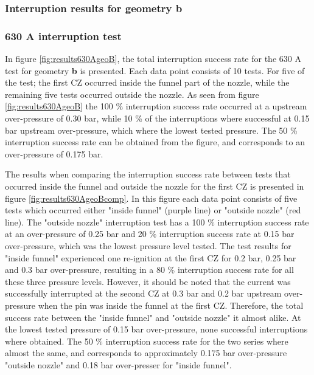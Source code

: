\documentclass[10pt,b5paper,twoside]{article}
\begin{document}
\subsubsection{Interruption results for geometry \textbf{b}} \label{sec:intTestGeoB}

\subsubsection*{630 A interruption test}

In figure \ref{fig:results630AgeoB}, the total interruption success rate for the 630 A test for geometry \textbf{b} is presented. Each data point consists of 10 tests. For five of the test; the first CZ occurred inside the funnel part of the nozzle, while the remaining five tests occurred outside the nozzle. As seen from figure \ref{fig:results630AgeoB} the 100 \% interruption success rate occurred at a upstream over-pressure of 0.30 bar, while 10 \% of the interruptions where successful at 0.15 bar upstream over-pressure, which where the lowest tested pressure. The 50 \% interruption success rate can be obtained from the figure, and corresponds to an over-pressure of 0.175 bar.

The results when comparing the interruption success rate between tests that occurred inside the funnel and outside the nozzle for the first CZ is presented in figure \ref{fig:results630AgeoBcomp}. In this figure each data point consists of five tests which occurred either "inside funnel" (purple line) or "outside nozzle" (red line). The "outside nozzle" interruption test has a 100 \% interruption success rate at an over-pressure of 0.25 bar and 20 \% interruption success rate at 0.15 bar over-pressure, which was the lowest pressure level tested. The test results for "inside funnel" experienced one re-ignition at the first CZ for 0.2 bar, 0.25 bar and 0.3 bar over-pressure, resulting in a 80 \% interruption success rate for all these three pressure levels. However, it should be noted that the current was successfully interrupted at the second CZ at 0.3 bar and 0.2 bar upstream over-pressure when the pin was inside the funnel at the first CZ. Therefore, the total success rate between the "inside funnel" and "outside nozzle" it almost alike. At the lowest tested pressure of 0.15 bar over-pressure, none successful interruptions where obtained. The 50 \% interruption success rate for the two series where almost the same, and corresponds to approximately 0.175 bar over-pressure "outside nozzle" and 0.18 bar over-presser for "inside funnel". 
\end{document}
